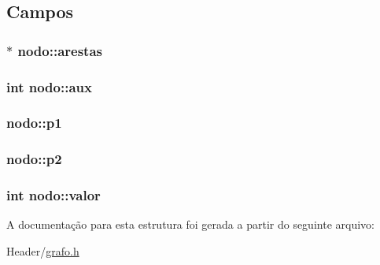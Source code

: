 \subsection{Campos}
\hypertarget{structnodo_ab939c8f7188b7431d2b50414a1fb9b6a}{
\subsubsection[{arestas}]{$\ast$ {\bf nodo::arestas}}}
\label{structnodo_ab939c8f7188b7431d2b50414a1fb9b6a}
\hypertarget{structnodo_a3ab5603f2d11bf431b67ce4185d8c66a}{
\subsubsection[{aux}]{\setlength{\rightskip}{0pt plus 5cm}int {\bf nodo::aux}}}
\label{structnodo_a3ab5603f2d11bf431b67ce4185d8c66a}
\hypertarget{structnodo_a5efde799b86ab12a2c58c2ff26a08cbd}{
\subsubsection[{p1}]{ {\bf nodo::p1}}}
\label{structnodo_a5efde799b86ab12a2c58c2ff26a08cbd}
\hypertarget{structnodo_a262cf060a5438e99f5b7b9110d0ca485}{
\subsubsection[{p2}]{ {\bf nodo::p2}}}
\label{structnodo_a262cf060a5438e99f5b7b9110d0ca485}
\hypertarget{structnodo_a40424c40ee6ffe6e5624f51ac42cbd20}{
\subsubsection[{valor}]{\setlength{\rightskip}{0pt plus 5cm}int {\bf nodo::valor}}}
\label{structnodo_a40424c40ee6ffe6e5624f51ac42cbd20}


A documentação para esta estrutura foi gerada a partir do seguinte arquivo:\begin{DoxyCompactItemize}
\item 
Header/\hyperlink{grafo_8h}{grafo.h}\end{DoxyCompactItemize}
